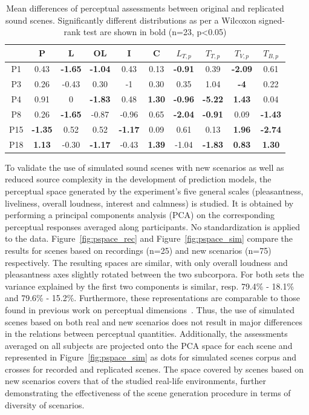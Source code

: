 \documentclass[twocolumn]{article}
\begin{document}
\begin{table}[t]
\centering
\caption{Mean differences of perceptual assessments between original and replicated sound scenes. Significantly different distributions as per a Wilcoxon signed-rank test are shown in bold (n=23, p<0.05)}
\label{tab:ogrep}
\begin{tabular}{ c | c c c c c c c c c }
\hline
	 & P & L & OL & I & C & $L_{T, p}$ & $T_{T, p}$ & $T_{V, p}$ & $T_{B, p}$ \\ \hline
	P1 & 0.43 & \textbf{-1.65} & \textbf{-1.04} & 0.43 & 0.13 & \textbf{-0.91} & 0.39 & \textbf{-2.09} & 0.61 \\
	P3 & 0.26 & -0.43 & 0.30 & -1 & 0.30 & 0.35 & 1.04 & \textbf{-4} & 0.22 \\
	P4 & 0.91 & 0 & \textbf{-1.83} & 0.48 & \textbf{1.30} & \textbf{-0.96} & \textbf{-5.22} & \textbf{1.43} & 0.04 \\
	P8 & 0.26 & \textbf{-1.65} & -0.87 & -0.96 & 0.65 & \textbf{-2.04} & \textbf{-0.91} & 0.09 & \textbf{-1.43} \\
	P15 & \textbf{-1.35} & 0.52 & 0.52 & \textbf{-1.17} & 0.09 & 0.61 & 0.13 & \textbf{1.96} & \textbf{-2.74} \\
	P18 & \textbf{1.13} & -0.30 & \textbf{-1.17} & -0.43 & \textbf{1.39} & -1.04 & \textbf{-1.83} & \textbf{0.83} & \textbf{1.30} \\ \hline
\end{tabular}
\end{table}

To validate the use of simulated sound scenes with new scenarios as well as reduced source complexity in the development of prediction models, the perceptual space generated by the experiment's five general scales (pleasantness, liveliness, overall loudness, interest and calmness) is studied. It is obtained by performing a principal components analysis (PCA) on the corresponding perceptual responses averaged along participants. No standardization is applied to the data. Figure~\ref{fig:pspace_rec} and Figure~\ref{fig:pspace_sim} compare the results for scenes based on recordings (n=25) and new scenarios (n=75) respectively. The resulting spaces are similar, with only overall loudness and pleasantness axes slightly rotated between the two subcorpora. For both sets the variance explained by the first two components is similar, resp. 79.4\% - 18.1\% and 79.6\% - 15.2\%. Furthermore, these representations are comparable to those found in previous work on perceptual dimensions~\cite{axelsson2010, cain2013}. Thus, the use of simulated scenes based on both real and new scenarios does not result in major differences in the relations between perceptual quantities. Additionally, the assessments averaged on all subjects are projected onto the PCA space for each scene and represented in Figure~\ref{fig:pspace_sim} as dots for simulated scenes corpus and crosses for recorded and replicated scenes. The space covered by scenes based on new scenarios covers that of the studied real-life environments, further demonstrating the effectiveness of the scene generation procedure in terms of diversity of scenarios.
\end{document}
